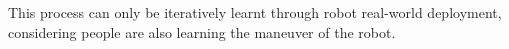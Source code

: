 \documentclass[conference]{IEEEtran}
\begin{document}
This process can only be iteratively learnt through robot real-world 
deployment, considering people are also learning the maneuver of the robot.








\end{document}
